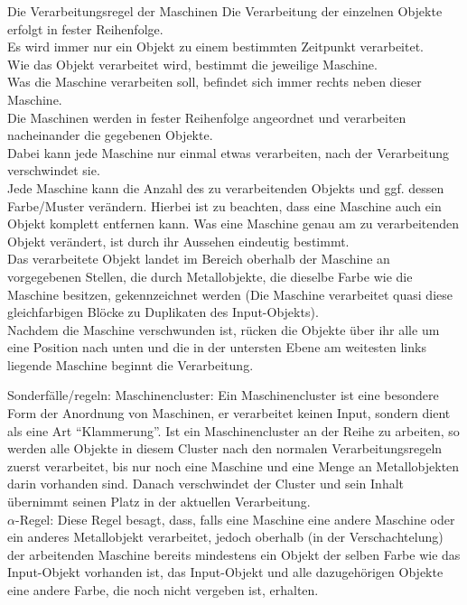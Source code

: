 \documentclass{scrartcl}
\begin{document}
\begin{description}
\begin{minipage}{1\textwidth}
	\item[Die Verarbeitungsregel der Maschinen] Die Verarbeitung der einzelnen Objekte erfolgt in fester Reihenfolge.\\
	Es wird immer nur ein Objekt zu einem bestimmten Zeitpunkt verarbeitet.\\
	Wie das Objekt verarbeitet wird, bestimmt die jeweilige Maschine.\\
	Was die Maschine verarbeiten soll, befindet sich immer rechts neben dieser Maschine.\\
	Die Maschinen werden in fester Reihenfolge angeordnet und verarbeiten nacheinander die gegebenen Objekte.\\
	Dabei kann jede Maschine nur einmal etwas verarbeiten, nach der Verarbeitung verschwindet sie.\\
	Jede Maschine kann die Anzahl des zu verarbeitenden Objekts und ggf. dessen Farbe/Muster verändern. Hierbei ist zu beachten, dass eine Maschine auch ein Objekt komplett entfernen kann. Was eine Maschine genau am zu verarbeitenden Objekt verändert, ist durch ihr Aussehen eindeutig bestimmt.\\
	Das verarbeitete Objekt landet im Bereich oberhalb der Maschine an vorgegebenen Stellen, die durch Metallobjekte, die dieselbe Farbe wie die Maschine besitzen, gekennzeichnet werden (Die Maschine verarbeitet quasi diese gleichfarbigen Blöcke zu Duplikaten des Input-Objekts).\\
	Nachdem die Maschine verschwunden ist, rücken die Objekte über ihr alle um eine Position nach unten und die in der untersten Ebene am weitesten links liegende Maschine beginnt die Verarbeitung.\\
\end{minipage}	
	
\begin{minipage}{1\textwidth}
	\item[Sonderfälle/regeln:] Maschinencluster: Ein Maschinencluster ist eine besondere Form der Anordnung von Maschinen, er verarbeitet keinen Input, sondern dient als eine Art \enquote{Klammerung}. Ist ein Maschinencluster an der Reihe zu arbeiten, so werden alle Objekte in diesem Cluster nach den normalen Verarbeitungsregeln zuerst verarbeitet, bis nur noch eine Maschine und eine Menge an Metallobjekten darin vorhanden sind. Danach verschwindet der Cluster und sein Inhalt übernimmt seinen Platz in der aktuellen Verarbeitung.\\
	$\alpha$-Regel: Diese Regel besagt, dass, falls eine Maschine eine andere Maschine oder ein anderes Metallobjekt verarbeitet, jedoch oberhalb (in der Verschachtelung) der arbeitenden Maschine bereits mindestens ein Objekt der selben Farbe wie das Input-Objekt vorhanden ist, das Input-Objekt und alle dazugehörigen Objekte eine andere Farbe, die noch nicht vergeben ist, erhalten.\\
\end{minipage}

\end{description}
\end{document}

